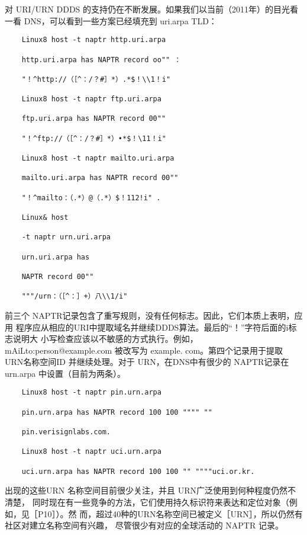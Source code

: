 对 URI/URN DDDS 的支持仍在不断发展。如果我们以当前（2011年）的目光看一看
DNS，可以看到一些方案已经填充到 uri.arpa TLD：

\begin{verbatim}
    Linux8 host -t naptr http.uri.arpa
    
    http.uri.arpa has NAPTR record oo"" ：
    
    "！^http://（［^：/？#］*）.*$！\\1！i"
    
    Linux8 host -t naptr ftp.uri.arpa
    
    ftp.uri.arpa has NAPTR record 00""
    
    "！^ftp://（［^：/？#］*）•*$！\11！i"
    
    Linux8 host -t naptr mailto.uri.arpa
    
    mailto.uri.arpa has NAPTR record 00""
    
    "！^mailto：（.*）@（.*）$！112!i" .
    
    Linux& host
    
    -t naptr urn.uri.arpa
    
    urn.uri.arpa has
    
    NAPTR record 00""
    
    """/urn：（［^：］+）八\\1/i"
\end{verbatim}

前三个 NAPTR记录包含了重写规则，没有任何标志。因此，它们本质上表明，应用
程序应从相应的URI中提取域名并继续DDDS算法。最后的“！”字符后面的i标志说明大
小写检查应该以不敏感的方式执行。例如，mAiLto:person@example.com 被改写为 example.
com。第四个记录用于提取 URN名称空间ID 并继续处理。对于 URN，在DNS中有很少的
NAPTR记录在 urn.arpa 中设置（目前为两条）。

\begin{verbatim}
    Linux8 host -t naptr pin.urn.arpa
    
    pin.urn.arpa has NAPTR record 100 100 """" ""
    
    pin.verisignlabs.com.
    
    Linux8 host -t naptr uci.urn.arpa
    
    uci.urn.arpa has NAPTR record 100 100 "" """"uci.or.kr.
\end{verbatim}

出现的这些URN 名称空间目前很少关注，并且 URN广泛使用到何种程度仍然不清楚，
同时现在有一些竞争的方法，它们使用持久标识符来表达和定位对象（例如，见［P10］）。然
而，超过40种的URN名称空间已被定义［URN］，所以仍然有社区对建立名称空间有兴趣，
尽管很少有对应的全球活动的 NAPTR 记录。

